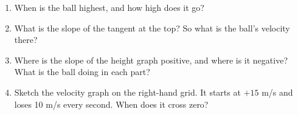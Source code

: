 \documentclass[12pt, twoside]{article}
\begin{document}
\begin{enumerate}[itemsep=0.4cm]
  \begin{enumerate}[itemsep=0.7cm]
    \item When is the ball highest, and how high does it go?
    \item What is the slope of the tangent at the top? So what is the ball's
      velocity there?
    \item Where is the slope of the height graph positive, and where is it negative?
      What is the ball doing in each part?
    \item Sketch the velocity graph on the right-hand grid. It starts at $+15$ m/s
      and loses 10 m/s every second. When does it cross zero?
  \end{enumerate}

\end{enumerate}
\end{document}
